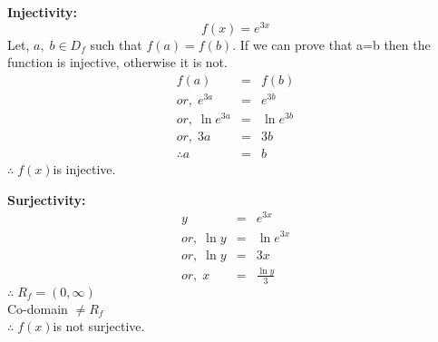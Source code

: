 \documentclass{article}
\begin{document}
\begin{minipage}[t]{0.4\linewidth}
\textbf{Injectivity:}
    $$f(x) = e^{3x}$$
Let, $a,\;b\in D_f$ such that $f(a) = f(b)$. If we can prove that a=b then the function is injective, otherwise it is not.
\begin{eqnarray*}
    f(a) &=& f(b)\\
    or,\;e^{3a} &=& e^{3b}\\
    or,\;\ln{e^{3a}} &=& \ln{e^{3b}}\\
    or,\;3a&=&3b\\
    \therefore a&=&b
\end{eqnarray*}
$\therefore\;f(x)$is injective.
\end{minipage}\hfill
\begin{minipage}[t]{0.4\linewidth}
\textbf{Surjectivity:}
\begin{eqnarray*}
    y&=&e^{3x}\\
    or,\;\ln{y} &=& \ln{e^{3x}}\\
    or,\;\ln{y} &=& 3x\\
    or,\;x &=& \frac{\ln{y}}{3}
\end{eqnarray*}
    $\therefore\;R_f=(0,\infty)$\\ 
Co-domain $\ne R_f$\\
    $\therefore\;f(x)$is not surjective.
\end{minipage}

\vspace{1cm}
\vspace{1cm}
\end{document}

